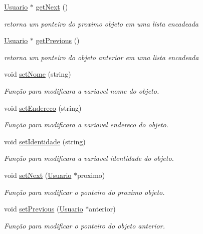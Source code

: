 \begin{DoxyCompactItemize}
\hyperlink{class_usuario}{Usuario} $\ast$ \hyperlink{class_usuario_ab8d7a12c2a1467e0241914c0a15a458f}{get\+Next} ()
\begin{DoxyCompactList}\small\item\em retorna um ponteiro do proximo objeto em uma lista encadeada \end{DoxyCompactList}\item 
\hyperlink{class_usuario}{Usuario} $\ast$ \hyperlink{class_usuario_adabcb9ad2b3d4113a156bf2bb1ff34b2}{get\+Previous} ()
\begin{DoxyCompactList}\small\item\em retorna um ponteiro do objeto anterior em uma lista encadeada \end{DoxyCompactList}\item 
void \hyperlink{class_usuario_a0d002d4ceff9c827457269a24a3e6c24}{set\+Nome} (string)
\begin{DoxyCompactList}\small\item\em Função para modificara a variavel nome do objeto. \end{DoxyCompactList}\item 
void \hyperlink{class_usuario_a751f967a6baa0f88104e85418a7ae2a6}{set\+Endereco} (string)
\begin{DoxyCompactList}\small\item\em Função para modificara a variavel endereco do objeto. \end{DoxyCompactList}\item 
void \hyperlink{class_usuario_a4ab8089f937b58a05d14fa49d41b67e1}{set\+Identidade} (string)
\begin{DoxyCompactList}\small\item\em Função para modificara a variavel identidade do objeto. \end{DoxyCompactList}\item 
void \hyperlink{class_usuario_a6ac654a85a5b9d0a45e008e9e5876298}{set\+Next} (\hyperlink{class_usuario}{Usuario} $\ast$proximo)
\begin{DoxyCompactList}\small\item\em Função para modificar o ponteiro do proximo objeto. \end{DoxyCompactList}\item 
void \hyperlink{class_usuario_af9048c1b41e3d75d9f3762cad60f4cd7}{set\+Previous} (\hyperlink{class_usuario}{Usuario} $\ast$anterior)
\begin{DoxyCompactList}\small\item\em Função para modificar o ponteiro do objeto anterior. \end{DoxyCompactList}\end{DoxyCompactItemize}
